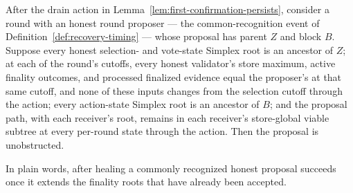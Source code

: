 \begin{lemma}
\label{lem:post-healing-proposer}
After the drain action in
Lemma~\ref{lem:first-confirmation-persists}, consider a round with an
honest round proposer --- the common-recognition event of
Definition~\ref{def:recovery-timing} --- whose proposal has parent
\(Z\) and block \(B\).  Suppose every honest selection- and vote-state
Simplex root is an ancestor of \(Z\); at each of the round's
cutoffs, every honest validator's store maximum, active finality
outcomes, and processed finalized evidence equal the proposer's at that
same cutoff, and none of these inputs changes from the selection cutoff
through the action; every
action-state Simplex root is an
ancestor of \(B\); and the proposal path, with each receiver's root,
remains in each receiver's
store-global viable subtree at every per-round state through the
action.  Then the proposal is unobstructed.

In plain words, after healing a commonly recognized honest proposal
succeeds once it extends the finality roots that have already been
accepted.
\end{lemma}

